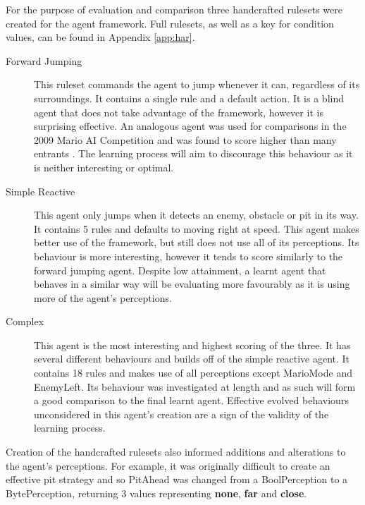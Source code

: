 For the purpose of evaluation and comparison three handcrafted rulesets were created for the agent framework. Full rulesets, as well as a key for condition values, can be found in Appendix \ref{app:har}.

\begin{description}
	\item[Forward Jumping] This ruleset commands the agent to jump whenever it can, regardless of its surroundings. It contains a single rule and a default action. It is a blind agent that does not take advantage of the framework, however it is surprising effective. An analogous agent was used for comparisons in the 2009 Mario AI Competition and was found to score higher than many entrants \cite[p.~7]{2010the}. The learning process will aim to discourage this behaviour as it is neither interesting or optimal.
	\item[Simple Reactive] This agent only jumps when it detects an enemy, obstacle or pit in its way. It contains 5 rules and defaults to moving right at speed. This agent makes better use of the framework, but still does not use all of its perceptions. Its behaviour is more interesting, however it tends to score similarly to the forward jumping agent. Despite low attainment, a learnt agent that behaves in a similar way will be evaluating more favourably as it is using more of the agent's perceptions.
	\item[Complex] This agent is the most interesting and highest scoring of the three. It has several different behaviours and builds off of the simple reactive agent. It contains 18 rules and makes use of all perceptions except MarioMode and EnemyLeft. Its behaviour was investigated at length and as such will form a good comparison to the final learnt agent. Effective evolved behaviours unconsidered in this agent's creation are a sign of the validity of the learning process. 
\end{description}
Creation of the handcrafted rulesets also informed additions and alterations to the agent's perceptions. For example, it was originally difficult to create an effective pit strategy and so PitAhead was changed from a BoolPerception to a BytePerception, returning 3 values representing \textbf{none}, \textbf{far} and \textbf{close}.

